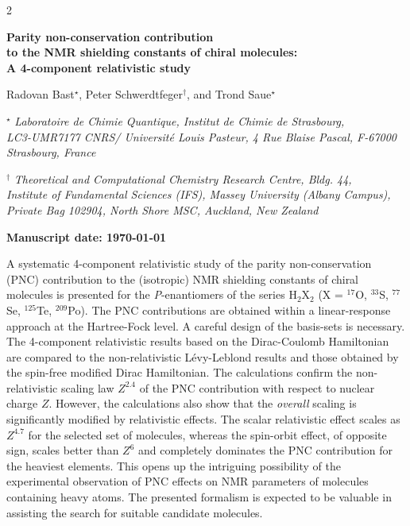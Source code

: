 \documentclass[a4paper,12pt,english]{article}
\begin{document}
\begin{spacing}{2}
\begin{center}
{\bfseries\large Parity non-conservation contribution\\to the NMR shielding constants of chiral molecules:\\}
\vspace{5mm}
{\bfseries\large A 4-component relativistic study}
\end{center}
\begin{center}
Radovan Bast$^\star$, Peter Schwerdtfeger$^\dag$, and Trond Saue$^\star$
\end{center}
\begin{center}
$^\star$ {\em\footnotesize Laboratoire de Chimie Quantique, Institut de Chimie de Strasbourg,\\LC3-UMR7177 CNRS/ Universit\'e Louis Pasteur, 4 Rue Blaise Pascal, F-67000 Strasbourg, France}

\noindent $^\dag$ {\em\footnotesize Theoretical and Computational Chemistry Research Centre, Bldg. 44,\\Institute of Fundamental Sciences (IFS), Massey University (Albany Campus),\\Private Bag 102904, North Shore MSC, Auckland, New Zealand}
\end{center}
\begin{center}{\bf Manuscript date: \today}\\\end{center}
A systematic 4-component relativistic study of the parity non-conservation (PNC) contribution to the (isotropic) NMR shielding constants of chiral molecules is presented for the \emph{P}-enantiomers of the series H$_2$X$_2$ (X = $^{17}$O, $^{33}$S, $^{77}$Se, $^{125}$Te, $^{209}$Po). The PNC contributions are obtained within a linear-response approach at the Hartree-Fock level. A careful design of the basis-sets is necessary. The 4-component relativistic results based on the Dirac-Coulomb Hamiltonian are compared to the non-relativistic L\'evy-Leblond results and those obtained by the spin-free modified Dirac Hamiltonian. The calculations confirm the non-relativistic scaling law $Z^{2.4}$ of the PNC contribution with respect to nuclear charge $Z$. However, the calculations also show that the {\it overall} scaling is significantly modified by relativistic effects.
\noindent The scalar relativistic effect scales as $Z^{4.7}$ for the selected set of molecules, whereas the spin-orbit effect, of opposite sign, scales better than $Z^6$ and completely dominates the PNC contribution for the heaviest elements. This opens up the intriguing possibility of the experimental observation of PNC effects on NMR parameters of molecules containing heavy atoms. The presented formalism is expected to be valuable in assisting the search for suitable candidate molecules.
\newpage

\end{spacing}
\end{document}
